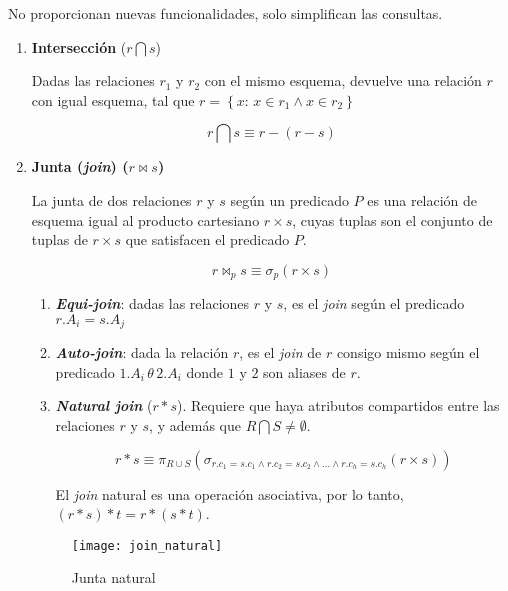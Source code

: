 \documentclass[a4paper, twoside]{article}
\begin{document}
No proporcionan nuevas funcionalidades, solo simplifican las consultas.
\begin{enumerate}
\item \textbf{Intersección} ($r\bigcap s$)


Dadas las relaciones $r_{1}$ y $r_{2}$ con el mismo esquema, devuelve
una relación $r$ con igual esquema, tal que $r=\left\{ x:\, x\in r_{1}\wedge x\in r_{2}\right\} $


\[
r\bigcap s\equiv r-\left(r-s\right)
\]


\item \textbf{Junta (}\textbf{\emph{join}}\textbf{) ($r\bowtie s$)}


La junta de dos relaciones $r$ y $s$ según un predicado $P$ es
una relación de esquema igual al producto cartesiano $r\times s$,
cuyas tuplas son el conjunto de tuplas de $r\times s$ que satisfacen
el predicado $P$.


\[
r\bowtie_{p}s\equiv\sigma_{p}\left(r\times s\right)
\]

\begin{enumerate}
\item \textbf{\emph{Equi-join}}: dadas las relaciones $r$ y $s$, es el
\emph{join} según el predicado $r.A_{i}=s.A_{j}$
\item \textbf{\emph{Auto-join}}: dada la relación $r$, es el \emph{join}
de $r$ consigo mismo según el predicado $1.A_{i}\,\theta\,2.A_{i}$
donde $1$ y $2$ son aliases de $r$.
\item \textbf{\emph{Natural join}}\textbf{ }($r*s$). Requiere que haya
atributos compartidos entre las relaciones $r$ y $s$, y además que
$R\bigcap S\neq\emptyset$.


\[
r*s\equiv\pi_{R\cup S}\left(\sigma_{r.c_{1}=s.c_{1}\wedge r.c_{2}=s.c_{2}\wedge\dots\wedge r.c_{h}=s.c_{h}}\left(r\times s\right)\right)
\]



El \emph{join} natural es una operación asociativa, por lo tanto,
$(r*s)*t=r*(s*t)$.

\end{enumerate}

\begin{figure}[H]
\noindent \begin{centering}
\texttt{[image: join\_natural]}
\par\end{centering}

\protect\caption{Junta natural}


\end{figure}



\end{enumerate}
\end{document}
